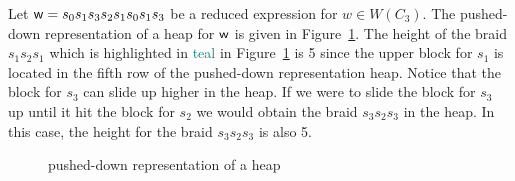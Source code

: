 \begin{example}
Let $\mathsf{w}=s_0s_1s_3s_2s_1s_0s_1s_3$ be a reduced expression for $w \in W(C_3)$. The pushed-down representation of a heap for $\mathsf{w}$ is given in Figure~\ref{fig:pusheddownheap}. The height of the braid $s_1s_2s_1$ which is highlighted in \textcolor{teal}{teal} in Figure~\ref{fig:pusheddownheap} is 5 since the upper block for $s_1$ is located in the fifth row of the pushed-down representation heap. Notice that the block for $s_3$ can slide up higher in the heap. If we were to slide the block for $s_3$ up until it hit the block for $s_2$ we would obtain the braid $s_3s_2s_3$ in the heap. In this case, the height for the braid $s_3s_2s_3$ is also 5.   

\begin{figure}[h!] \centering
{}	
\caption{pushed-down representation of a heap}\label{fig:pusheddownheap}
\end{figure}

	
\end{example}


